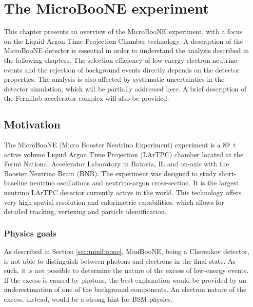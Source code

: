 \chapter{\label{ch:4-microboone}The MicroBooNE experiment}

\minitoc


This chapter presents an overview of the MicroBooNE experiment, with a focus on the Liquid Argon Time Projection Chamber technology. A description of the MicroBooNE detector is essential in order to understand the analysis described in the following chapters. The selection efficiency of low-energy electron neutrino events and the rejection of background events directly depends on the detector properties. The analysis is also affected by systematic uncertainties in the detector simulation, which will be partially addressed here. A brief description of the Fermilab accelerator complex will also be provided.

\section{Motivation}
The MicroBooNE (Micro Booster Neutrino Experiment) experiment is a 89~t active volume Liquid Argon Time Projection (LArTPC) chamber located at the Fermi National Accelerator Laboratory in Batavia, IL and on-axis with the Booster Neutrino Beam (BNB). The experiment was designed to study short-baseline neutrino oscillations and neutrino-argon cross-section. It is the largest neutrino LArTPC detector currently active in the world.
This technology offers very high spatial resolution and calorimetric capabilities, which allows for detailed tracking, vertexing and particle identification. 

\subsection{Physics goals}
As described in Section \ref{sec:miniboone}, MiniBooNE, being a Cherenkov detector, is not able to distinguish between photons and electrons in the final state. As such, it is not possible to determine the nature of the excess of low-energy events. If the excess is caused by photons, the best explanation would be provided by an underestimation of one of the background components. An electron nature of the excess, instead, would be a strong hint for BSM physics.


